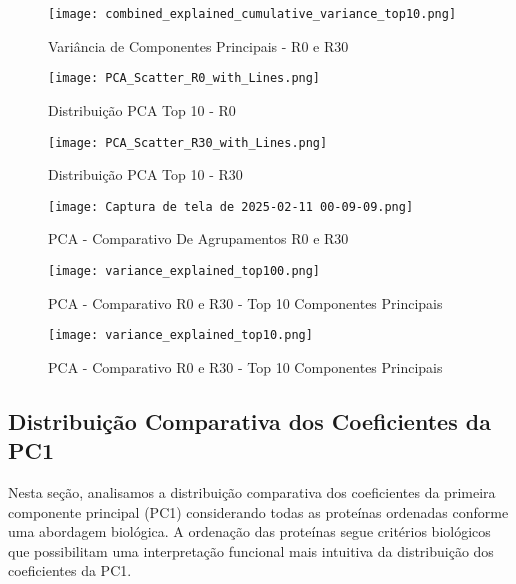 \documentclass[12pt]{article}
\begin{document}
\begin{figure}
    \centering
    \texttt{[image: combined\_explained\_cumulative\_variance\_top10.png]}
    \caption{Variância de Componentes Principais - R0 e R30}
    \label{fig:enter-label}
\end{figure}

\begin{figure}
    \centering
    \texttt{[image: PCA\_Scatter\_R0\_with\_Lines.png]}
    \caption{Distribuição PCA Top 10 - R0}
    \label{fig:enter-label}
\end{figure}

\begin{figure}
    \centering
    \texttt{[image: PCA\_Scatter\_R30\_with\_Lines.png]}
    \caption{Distribuição PCA Top 10 - R30}
    \label{fig:enter-label}
\end{figure}

\begin{figure}
    \centering
    \texttt{[image: Captura de tela de 2025-02-11 00-09-09.png]}
    \caption{PCA - Comparativo De Agrupamentos R0 e R30 }
    \label{fig:enter-label}
\end{figure}

\begin{figure}
    \centering
    \texttt{[image: variance\_explained\_top100.png]}
    \caption{PCA - Comparativo R0 e R30 - Top 10 Componentes Principais}
    \label{fig:enter-label}
\end{figure}

\begin{figure}
    \centering
    \texttt{[image: variance\_explained\_top10.png]}
    \caption{PCA - Comparativo R0 e R30 - Top 10 Componentes Principais}
    \label{fig:enter-label}
\end{figure}

\newpage

\subsection{Distribuição Comparativa dos Coeficientes da PC1}
Nesta seção, analisamos a distribuição comparativa dos coeficientes da primeira componente principal (PC1) considerando todas as proteínas ordenadas conforme uma abordagem biológica. A ordenação das proteínas segue critérios biológicos que possibilitam uma interpretação funcional mais intuitiva da distribuição dos coeficientes da PC1.
\end{document}
